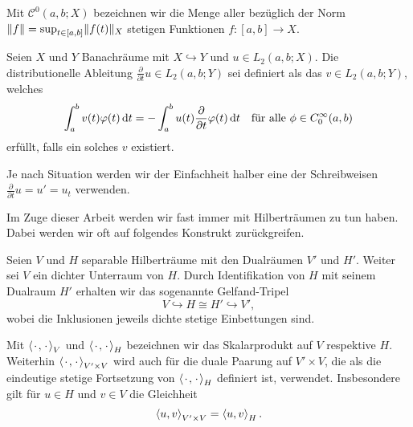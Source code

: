 \begin{Definition}
\label{definition:gl:stetige_funktionen}
    Mit $\mathcal C^{0}(a, b; X)$ bezeichnen wir die Menge aller bezüglich der Norm $\norm{f} = \sup_{t \in [a, b]} \norm{f(t)}_{X}$ stetigen Funktionen $f \colon [a, b] \to X$.
\end{Definition}

\begin{Definition}
\label{definition:gl:schwache_zeitableitung}
    Seien $X$ und $Y$ Banachräume mit $X \hookrightarrow Y$ und $u \in L_{2}(a, b; X)$.
    Die distributionelle Ableitung $\frac{\partial}{\partial t} u \in L_{2}(a, b; Y)$ sei definiert als das $v \in L_{2}(a, b; Y)$, welches
    \begin{equation}
        \int_{a}^{b} v(t) \varphi(t) \diff t = - \int_{a}^{b} u(t) \frac{\partial}{\partial t} \varphi(t) \diff t \quad \fa \phi \in C^{\infty}_{0}(a, b)
    \end{equation}
    erfüllt, falls ein solches $v$ existiert.
\end{Definition}

\begin{Bemerkung*}
    Je nach Situation werden wir der Einfachheit halber eine der Schreibweisen $\frac{\partial}{\partial t} u = u' = u_{t}$ verwenden.
\end{Bemerkung*}


Im Zuge dieser Arbeit werden wir fast immer mit Hilberträumen zu tun haben.
Dabei werden wir oft auf folgendes Konstrukt zurückgreifen.

\begin{Definition}
\label{definition:gl:gelfand_tripel}
    Seien $V$ und $H$ separable Hilberträume mit den Dualräumen $V'$ und $H'$.
    Weiter sei $V$ ein dichter Unterraum von $H$.
    Durch Identifikation von $H$ mit seinem Dualraum $H'$ erhalten wir das sogenannte Gelfand-Tripel
    \begin{equation}
        V \hookrightarrow H \cong H' \hookrightarrow V',
    \end{equation}
    wobei die Inklusionen jeweils dichte stetige Einbettungen sind.
\end{Definition}

\begin{Bemerkung*}
    Mit $\skprod{\blank}{\blank}_{V}$ und $\skprod{\blank}{\blank}_{H}$ bezeichnen wir das Skalarprodukt auf $V$ respektive $H$.
    Weiterhin $\skprod{\blank}{\blank}_{V' \times V}$ wird auch für die duale Paarung auf $V' \times V$, die als die eindeutige stetige Fortsetzung von $\skprod{\blank}{\blank}_{H}$ definiert ist, verwendet.
    Insbesondere gilt für $u \in H$ und $v \in V$ die Gleichheit
    \begin{equation}
        \skprod{u}{v}_{V' \times V} = \skprod{u}{v}_{H}.
    \end{equation}
\end{Bemerkung*}


